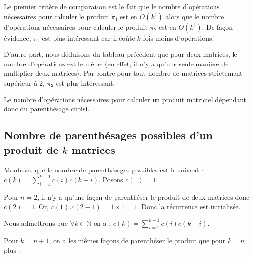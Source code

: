 Le premier critère de comparaison est le fait que le nombre d'opérations nécessaires pour calculer le produit $\pi_1$ est en $O(k^4)$ alors que le nombre d'opérations nécessaires pour calculer le produit $\pi_2$ est en $O(k^3)$. De façon évidence, $\pi_2$ est plus intéressant car il coûte $k$ fois moins d'opérations.

D'autre part, nous déduisons du tableau précédent que pour deux matrices, le nombre d'opérations est le même (en effet, il n'y a qu'une seule manière de multiplier deux matrices). Par contre pour tout nombre de matrices strictement supérieur à 2, $\pi_2$ est plus intéressant.

Le nombre d'opérations nécessaires pour calculer un produit matriciel dépendant donc du parenthésage choisi.

 
 
\subsection{Nombre de parenthésages possibles d'un produit de $k$ matrices}
Montrons que le nombre de parenthésages possibles est le suivant : $c(k)=\sum\limits_{i=1}^{k-1}{c(i)c(k-i)}$. Posons $c(1)=1$.

Pour $n=2$, il n'y a qu'une façon de parenthéser le produit de deux matrices donc $c(2)=1$. Or, $c(1).c(2-1) = 1 \times 1 = 1$. Donc la récurrence est initialisée.

Nous admettrons que $\forall k \in \mathbb{N}$ on a : $c(k)=\sum\limits_{i=1}^{k-1}{c(i)c(k-i)}$.

Pour $k = n+1$, on a les mêmes façons de parenthéser le produit que pour $k=n$ plus .


